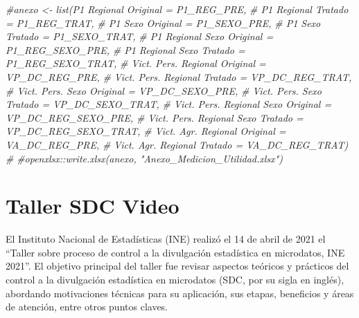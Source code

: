 \documentclass[
]{book}
\newenvironment{Shaded}{\begin{snugshade}}{\end{snugshade}}
\newcommand{\CommentTok}[1]{\textcolor[rgb]{0.56,0.35,0.01}{\textit{#1}}}
\theoremstyle{definition}
\theoremstyle{definition}
\theoremstyle{definition}
\theoremstyle{definition}
\theoremstyle{remark}
\begin{document}
\begin{Shaded}
\begin{Highlighting}[]
\CommentTok{\#anexo \textless{}{-} list(\textquotesingle{}P1 Regional Original\textquotesingle{} = P1\_REG\_PRE,}
\CommentTok{\#              \textquotesingle{}P1 Regional Tratado\textquotesingle{} = P1\_REG\_TRAT,}
\CommentTok{\#              \textquotesingle{}P1 Sexo Original\textquotesingle{} = P1\_SEXO\_PRE,}
\CommentTok{\#              \textquotesingle{}P1 Sexo Tratado\textquotesingle{} = P1\_SEXO\_TRAT,}
\CommentTok{\#              \textquotesingle{}P1 Regional Sexo Original\textquotesingle{} = P1\_REG\_SEXO\_PRE,}
\CommentTok{\#              \textquotesingle{}P1 Regional Sexo Tratado\textquotesingle{} = P1\_REG\_SEXO\_TRAT,}
\CommentTok{\#              \textquotesingle{}Vict. Pers. Regional Original\textquotesingle{} = VP\_DC\_REG\_PRE,}
\CommentTok{\#              \textquotesingle{}Vict. Pers. Regional Tratado\textquotesingle{} = VP\_DC\_REG\_TRAT,}
\CommentTok{\#              \textquotesingle{}Vict. Pers. Sexo Original\textquotesingle{} = VP\_DC\_SEXO\_PRE,}
\CommentTok{\#              \textquotesingle{}Vict. Pers. Sexo Tratado\textquotesingle{} = VP\_DC\_SEXO\_TRAT,}
\CommentTok{\#              \textquotesingle{}Vict. Pers. Regional Sexo Original\textquotesingle{} = VP\_DC\_REG\_SEXO\_PRE,}
\CommentTok{\#              \textquotesingle{}Vict. Pers. Regional Sexo Tratado\textquotesingle{} = VP\_DC\_REG\_SEXO\_TRAT,}
\CommentTok{\#              \textquotesingle{}Vict. Agr. Regional Original\textquotesingle{} = VA\_DC\_REG\_PRE,}
\CommentTok{\#              \textquotesingle{}Vict. Agr. Regional Tratado\textquotesingle{} = VA\_DC\_REG\_TRAT)}
\CommentTok{\#}
\CommentTok{\#openxlsx::write.xlsx(anexo, "Anexo\_Medicion\_Utilidad.xlsx")}
\end{Highlighting}
\end{Shaded}

\hypertarget{taller-sdc-video}{%
\chapter{Taller SDC Video}\label{taller-sdc-video}}

El Instituto Nacional de Estadísticas (INE) realizó el 14 de abril de 2021 el ``Taller sobre proceso de control a la divulgación estadística en microdatos, INE 2021''. El objetivo principal del taller fue revisar aspectos teóricos y prácticos del control a la divulgación estadística en microdatos (SDC, por su sigla en inglés), abordando motivaciones técnicas para su aplicación, sus etapas, beneficios y áreas de atención, entre otros puntos claves.
\end{document}
